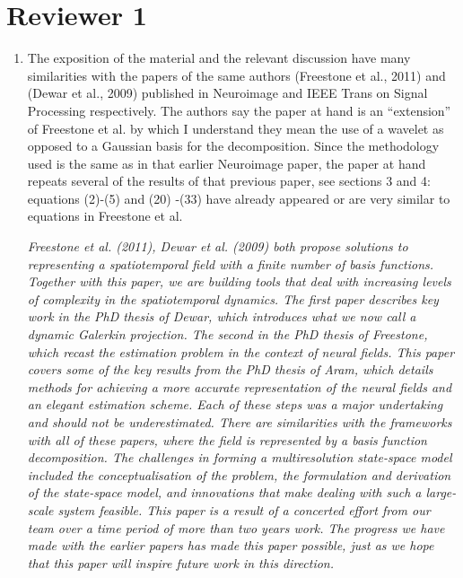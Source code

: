 \documentclass{article}
\begin{document}
\begin{enumerate}
\end{enumerate}

    \section{Reviewer 1}
    

    \begin{enumerate}
        \item The exposition of the material and the relevant discussion have many similarities with the papers of the same authors (Freestone et al., 2011) and (Dewar et al., 2009) published in Neuroimage and IEEE Trans on Signal Processing  respectively. The authors say the paper at hand is an ``extension'' of Freestone et al. by which I understand they mean the use of a wavelet as opposed to a Gaussian basis for the decomposition. Since the methodology used is the same as in that earlier Neuroimage paper, the paper at hand repeats several of  the results of that previous paper, see sections 3 and 4: equations (2)-(5) and (20) -(33) have already appeared or are very similar to equations in Freestone et al.   
								 
	\emph{Freestone et al. (2011), Dewar et al. (2009) both propose solutions to representing a spatiotemporal field with a finite number of basis functions. Together with this paper, we are building tools that deal with increasing levels of complexity in the spatiotemporal dynamics. The first paper describes key work in the PhD thesis of Dewar, which introduces what we now call a dynamic Galerkin projection. The second in the PhD thesis of Freestone, which recast the estimation problem in the context of neural fields. This paper covers some of the key results from the PhD thesis of Aram, which details methods for achieving a more accurate representation of the neural fields and an elegant estimation scheme. Each of these steps was a major undertaking and should not be underestimated. There are similarities with the frameworks with all of these papers, where the field is represented by a basis function decomposition. The challenges in forming a multiresolution state-space model included the conceptualisation of the problem, the formulation and derivation of the state-space model, and innovations that make dealing with such a large-scale system feasible. This paper is a result of a concerted effort from our team over a time period of more than two years work. The progress we have made with the earlier papers has made this paper possible, just as we hope that this paper will inspire future work in this direction.}
	        

\end{enumerate}
\end{document}
